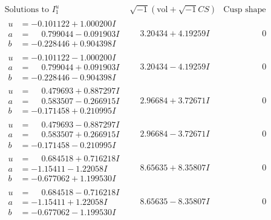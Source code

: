 \documentclass[1p]{elsarticle_modified}
\theoremstyle{definition}
\newcommand{\I}{\sqrt{-1}}
\begin{document}
$$\begin{array}{c|c|c}  
\text{Solutions to }I^u_{1}& \I (\text{vol} + \sqrt{-1}CS) & \text{Cusp shape}\\
 \hline 
\begin{aligned}
u &= -0.101122 + 1.000200 I \\
a &= \phantom{-}0.799044 - 0.091903 I \\
b &= -0.228446 + 0.904398 I\end{aligned}
 & \phantom{-}3.20434 + 4.19259 I & \phantom{-0.000000 } 0 \\ \hline\begin{aligned}
u &= -0.101122 - 1.000200 I \\
a &= \phantom{-}0.799044 + 0.091903 I \\
b &= -0.228446 - 0.904398 I\end{aligned}
 & \phantom{-}3.20434 - 4.19259 I & \phantom{-0.000000 } 0 \\ \hline\begin{aligned}
u &= \phantom{-}0.479693 + 0.887297 I \\
a &= \phantom{-}0.583507 - 0.266915 I \\
b &= -0.171458 + 0.210995 I\end{aligned}
 & \phantom{-}2.96684 + 3.72671 I & \phantom{-0.000000 } 0 \\ \hline\begin{aligned}
u &= \phantom{-}0.479693 - 0.887297 I \\
a &= \phantom{-}0.583507 + 0.266915 I \\
b &= -0.171458 - 0.210995 I\end{aligned}
 & \phantom{-}2.96684 - 3.72671 I & \phantom{-0.000000 } 0 \\ \hline\begin{aligned}
u &= \phantom{-}0.684518 + 0.716218 I \\
a &= -1.15411 - 1.22058 I \\
b &= -0.677062 + 1.199530 I\end{aligned}
 & \phantom{-}8.65635 + 8.35807 I & \phantom{-0.000000 } 0 \\ \hline\begin{aligned}
u &= \phantom{-}0.684518 - 0.716218 I \\
a &= -1.15411 + 1.22058 I \\
b &= -0.677062 - 1.199530 I\end{aligned}
 & \phantom{-}8.65635 - 8.35807 I & \phantom{-0.000000 } 0 \\ \hline\begin{aligned}

\end{aligned}
\end{array}$$
\end{document}
